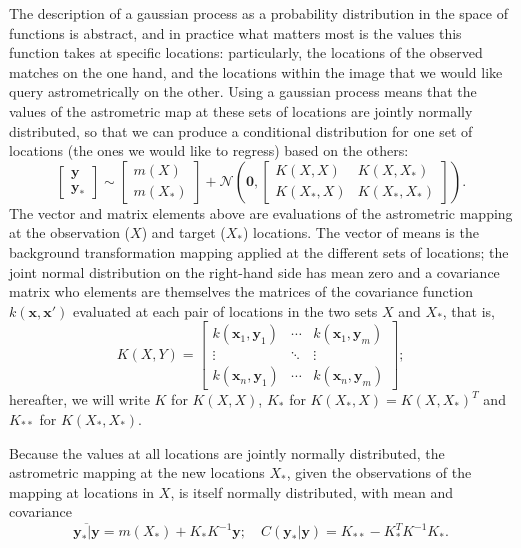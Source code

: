 \documentclass[manuscript]{aastex}
\begin{document}
The description of a gaussian process as a probability distribution in the space of functions is abstract, and in practice what matters most is the values this function takes at specific locations: particularly, the locations of the observed matches on the one hand, and the locations within the image that we would like query astrometrically on the other. Using a gaussian process means that the values of the astrometric map at these sets of locations are jointly normally distributed, so that we can produce a conditional distribution for one set of locations (the ones we would like to regress) based on the others:
\begin{equation}
\left[\begin{array}{c} \mathbf{y} \\ \mathbf{y}_\ast\end{array}\right] \sim \left[\begin{array}{c} m(X) \\ m(X_\ast)\end{array}\right] + \mathcal{N}\left( \mathbf{0},
\left[\begin{array}{cc}
K(X,X) & K(X,X_\ast) \\
K(X_\ast,X) & K(X_\ast,X_\ast)
\end{array}\right] \right).
\end{equation}
The vector and matrix elements above are evaluations of the astrometric mapping at the observation ($X$) and target ($X_\ast$) locations. The vector of means is the background transformation mapping applied at the different sets of locations; the joint normal distribution on the right-hand side has mean zero and a covariance matrix who elements are themselves the matrices of the covariance function $k(\mathbf{x}, \mathbf{x}')$ evaluated at each pair of locations in the two sets $X$ and $X_\ast$, that is, 
\begin{equation}
K(X,Y) = \left[\begin{array}{cccc}
k(\mathbf{x}_1,\mathbf{y}_1)  & \cdots & k(\mathbf{x}_1,\mathbf{y}_m) \\
\vdots&\ddots&\vdots \\
k(\mathbf{x}_n,\mathbf{y}_1)&\cdots& k(\mathbf{x}_n,\mathbf{y}_m)
\end{array}\right];
\end{equation}
hereafter, we will write $K$ for $K(X,X)$, $K_\ast$ for $K(X_\ast,X)=K(X,X_\ast)^T$ and $K_{\ast\ast}$ for $K(X_\ast,X_\ast)$.

Because the values at all locations are jointly normally distributed, the astrometric mapping at the new locations $X_\ast$, given the observations of the mapping at locations in $X$, is itself normally distributed, with mean and covariance
\begin{equation}
 \overline{\mathbf{y}_\ast | \mathbf{y}} = m(X_\ast) + K_\ast K^{-1} \mathbf{y}; \quad C(\mathbf{y}_\ast | \mathbf{y}) = K_{\ast\ast} - K_\ast^T K^{-1} K_\ast.
\end{equation}
\end{document}

